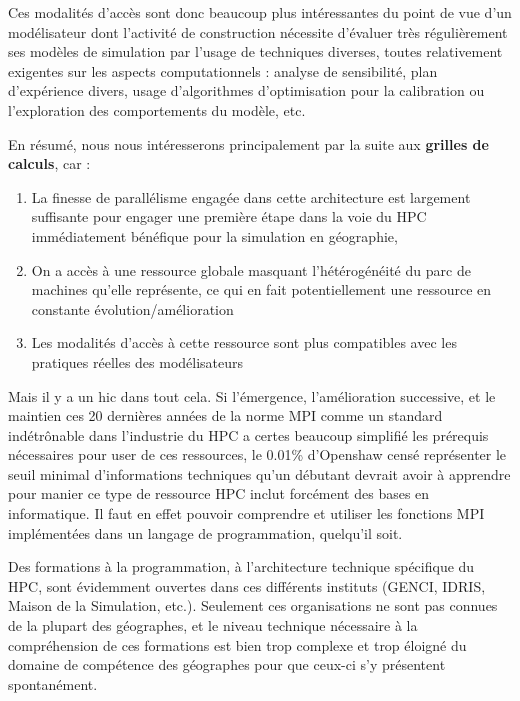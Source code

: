 Ces modalités d'accès sont donc beaucoup plus intéressantes du point de vue d'un modélisateur dont l'activité de construction nécessite d'évaluer très régulièrement ses modèles de simulation par l'usage de techniques diverses, toutes relativement exigentes sur les aspects computationnels : analyse de sensibilité, plan d'expérience divers, usage d'algorithmes d'optimisation pour la calibration ou l'exploration des comportements du modèle, etc.

En résumé, nous nous intéresserons principalement par la suite aux \textbf{grilles de calculs}, car :

\begin{enumerate}[label=(\alph*),labelindent=\parindent,leftmargin=*]
\item La finesse de parallélisme engagée dans cette architecture est largement suffisante pour engager une première étape dans la voie du HPC immédiatement bénéfique pour la simulation en géographie,
\item On a accès à une ressource globale masquant l'hétérogénéité du parc de machines qu'elle représente, ce qui en fait potentiellement une ressource en constante évolution/amélioration
\item Les modalités d'accès à cette ressource sont plus compatibles avec les pratiques réelles des modélisateurs
\end{enumerate}

Mais il y a un hic dans tout cela. Si l'émergence, l'amélioration successive, et le maintien ces 20 dernières années de la norme MPI comme un standard indétrônable dans l'industrie du HPC a certes beaucoup simplifié les prérequis nécessaires pour user de ces ressources, le 0.01\% d'Openshaw censé représenter le seuil minimal d'informations techniques qu'un débutant devrait avoir à apprendre pour manier ce type de ressource HPC inclut forcément des bases en informatique. Il faut en effet pouvoir comprendre et utiliser les fonctions MPI implémentées dans un langage de programmation, quelqu'il soit.

Des formations à la programmation, à l'architecture technique spécifique du HPC, sont évidemment ouvertes dans ces différents instituts (GENCI, IDRIS, Maison de la Simulation, etc.). Seulement ces organisations ne sont pas connues de la plupart des géographes, et le niveau technique nécessaire à la compréhension de ces formations est bien trop complexe et trop éloigné du domaine de compétence des géographes pour que ceux-ci s'y présentent spontanément.

